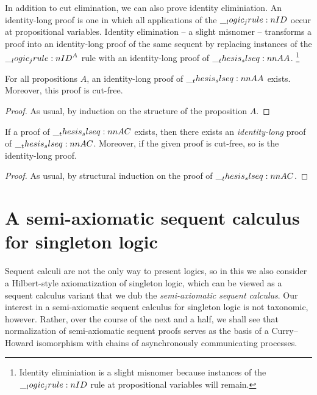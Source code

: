 In addition to cut elimination, we can also prove identity eliminiation.
An identity-long proof is one in which all applications of the $\__logic_jrule:n {ID}$ occur at propositional variables.
Identity elimination -- a slight misnomer -- transforms a proof into an identity-long proof of the same sequent by replacing instances of the $\__logic_jrule:n {ID}^A$ rule with an identity-long proof of $\slseq{A |- A}$.%
\footnote{Identity eliminiation is a slight misnomer because instances of the $\__logic_jrule:n {ID}$ rule at propositional variables will remain.}

\begin{lemma}
  For all propositions $A$, an identity-long proof of $\slseq{A |- A}$ exists.
  Moreover, this proof is cut-free.
\end{lemma}
\begin{proof}
  As usual, by induction on the structure of the proposition $A$.
\end{proof}

\begin{theorem}
  If a proof of $\slseq{A |- C}$ exists, then there exists an \emph{identity-long} proof of $\slseq{A |- C}$.
  Moreover, if the given proof is cut-free, so is the identity-long proof.
\end{theorem}
\begin{proof}
  As usual, by structural induction on the proof of $\slseq{A |- C}$.
\end{proof}


\section{A semi-axiomatic sequent calculus for singleton logic}\label{sec:singleton-logic:hilbert}\label{sec:singleton-logic:sax}

Sequent calculi are not the only way to present logics, so
in this  we also consider a Hilbert-style axiomatization of singleton logic, which can be viewed as a sequent calculus variant that we dub the \emph{semi-axiomatic sequent calculus}\autocite{DeYoung+:FSCD20}.
Our interest in a semi-axiomatic sequent calculus for singleton logic is not taxonomic, however.
Rather, over the course of the next  and a half, we shall see that normalization of semi-axiomatic sequent proofs serves as the basis of a Curry--Howard isomorphism with chains of asynchronously communicating processes.

